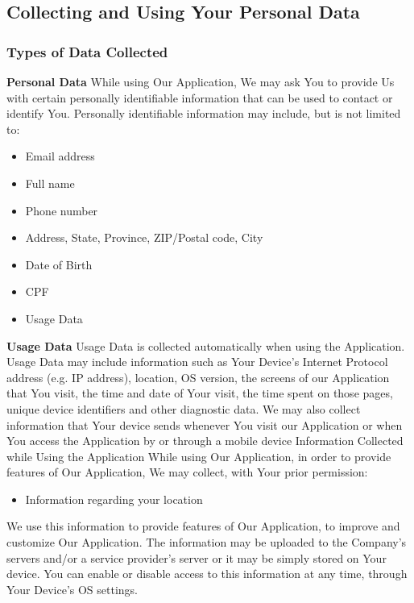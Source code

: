 \documentclass{article}
\begin{document}
\subsection*{Collecting and Using Your Personal Data}
\subsubsection*{Types of Data Collected}
\textbf{Personal Data}\newline
While using Our Application, We may ask You to provide Us with certain personally identifiable information that can be used to contact or identify You. Personally identifiable information may include, but is not limited to:
\begin{itemize}
    \item Email address
    \item Full name
    \item Phone number
    \item Address, State, Province, ZIP/Postal code, City
    \item Date of Birth
    \item CPF
    \item Usage Data
\end{itemize}
\textbf{Usage Data}\newline
Usage Data is collected automatically when using the Application.\newline
Usage Data may include information such as Your Device's Internet Protocol address (e.g. IP address), location, OS  version, the screens of our Application that You visit, the time and date of Your visit, the time spent on those pages, unique device identifiers and other diagnostic data.\newline
We may also collect information that Your device sends whenever You visit our Application or when You access the Application by or through a mobile device\newline
Information Collected while Using the Application\newline
While using Our Application, in order to provide features of Our Application, We may collect, with Your prior permission:
\begin{itemize}
    \item Information regarding your location
\end{itemize}
We use this information to provide features of Our Application, to improve and customize Our Application. The information may be uploaded to the Company's servers and/or a service provider's server or it may be simply stored on Your device.\newline
You can enable or disable access to this information at any time, through Your Device's OS settings.\newline
\end{document}
